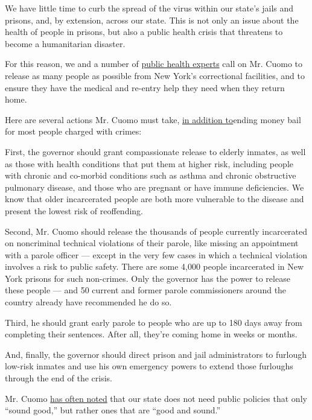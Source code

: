 We have little time to curb the spread of the virus within our state's
jails and prisons, and, by extension, across our state. This is not only
an issue about the health of people in prisons, but also a public health
crisis that threatens to become a humanitarian disaster.

For this reason, we and a number of
\href{https://thehill.com/opinion/criminal-justice/488802-coronavirus-behind-bars-4-priorities-to-save-the-lives-of-prisoners}{public
health experts} call on Mr. Cuomo to release as many people as possible
from New York's correctional facilities, and to ensure they have the
medical and re-entry help they need when they return home.

Here are several actions Mr. Cuomo must take,
\href{https://www.nytimes3xbfgragh.onion/2020/01/24/opinion/sunday/bail-reform-new-york.html}{in
addition to}ending money bail for most people charged with crimes:

First, the governor should grant compassionate release to elderly
inmates, as well as those with health conditions that put them at higher
risk, including people with chronic and co-morbid conditions such as
asthma and chronic obstructive pulmonary disease, and those who are
pregnant or have immune deficiencies. We know that older incarcerated
people are both more vulnerable to the disease and present the lowest
risk of reoffending.

Second, Mr. Cuomo should release the thousands of people currently
incarcerated on noncriminal technical violations of their parole, like
missing an appointment with a parole officer --- except in the very few
cases in which a technical violation involves a risk to public safety.
There are some 4,000 people incarcerated in New York prisons for such
non-crimes. Only the governor has the power to release these people ---
and 50 current and former parole commissioners around the country
already have recommended he do so.

Third, he should grant early parole to people who are up to 180 days
away from completing their sentences. After all, they're coming home in
weeks or months.

And, finally, the governor should direct prison and jail administrators
to furlough low-risk inmates and use his own emergency powers to extend
those furloughs through the end of the crisis.

Mr. Cuomo
\href{https://www.washingtonpost.com/opinions/andrew-cuomo-35-questions-about-our-current-political-climate/2019/04/22/e27b752a-6520-11e9-82ba-fcfeff232e8f_story.html}{has
often noted} that our state does not need public policies that only
``sound good,'' but rather ones that are ``good and sound.''

